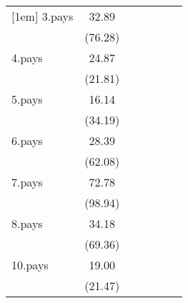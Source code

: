 {\begin{tabular}{l*{6}{c}}
[1em]
3.pays              &       32.89\sym{***}&                     &                     &                     &                     &                     \\
                    &     (76.28)         &                     &                     &                     &                     &                     \\
[1em]
4.pays              &       24.87\sym{***}&                     &                     &                     &                     &                     \\
                    &     (21.81)         &                     &                     &                     &                     &                     \\
[1em]
5.pays              &       16.14\sym{***}&                     &                     &                     &                     &                     \\
                    &     (34.19)         &                     &                     &                     &                     &                     \\
[1em]
6.pays              &       28.39\sym{***}&                     &                     &                     &                     &                     \\
                    &     (62.08)         &                     &                     &                     &                     &                     \\
[1em]
7.pays              &       72.78\sym{***}&                     &                     &                     &                     &                     \\
                    &     (98.94)         &                     &                     &                     &                     &                     \\
[1em]
8.pays              &       34.18\sym{***}&                     &                     &                     &                     &                     \\
                    &     (69.36)         &                     &                     &                     &                     &                     \\
[1em]
10.pays             &       19.00\sym{***}&                     &                     &                     &                     &                     \\
                    &     (21.47)         &                     &                     &                     &                     &                     \\

\end{tabular}}
